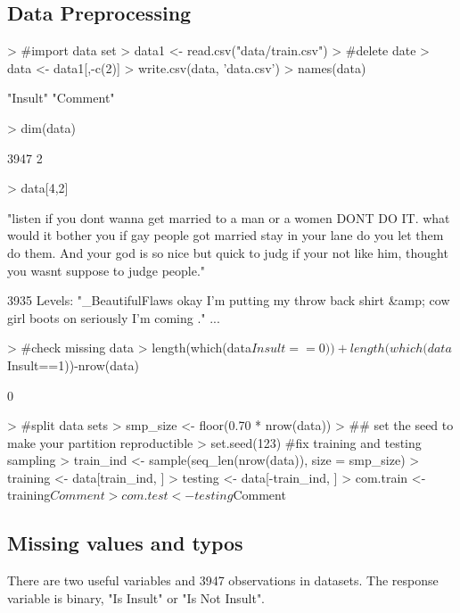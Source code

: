 \documentclass[11pt]{article}
\begin{document}
\begin{singlespacing}
\section{Data Preprocessing}
\begin{Schunk}
\begin{Sinput}
> #import data set
> data1 <- read.csv("data/train.csv")
> #delete date
> data <- data1[,-c(2)]
> write.csv(data, 'data.csv')
> names(data)
\end{Sinput}
\begin{Soutput}
[1] "Insult"  "Comment"
\end{Soutput}
\begin{Sinput}
> dim(data)
\end{Sinput}
\begin{Soutput}
[1] 3947    2
\end{Soutput}
\begin{Sinput}
> data[4,2]
\end{Sinput}
\begin{Soutput}
[1] "listen if you dont wanna get married to a man or a women DONT DO IT. what would it bother 
you if gay people got married stay in your lane do you let them do them. And your god is so nice 
but quick to judg if your not like him, thought you wasnt suppose to judge people."

3935 Levels: "_BeautifulFlaws okay I'm putting my throw back shirt &amp; cow girl boots on
seriously I'm coming ." ...
\end{Soutput}
\begin{Sinput}
> #check missing data
> length(which(data$Insult==0))+length(which(data$Insult==1))-nrow(data)
\end{Sinput}
\begin{Soutput}
[1] 0
\end{Soutput}
\begin{Sinput}
> #split data sets
> smp_size <- floor(0.70 * nrow(data))
> ## set the seed to make your partition reproductible
> set.seed(123) #fix training and testing sampling
> train_ind <- sample(seq_len(nrow(data)), size = smp_size)
> training <- data[train_ind, ]
> testing <- data[-train_ind, ]
> com.train <- training$Comment
> com.test <- testing$Comment
\end{Sinput}
\end{Schunk}
 
\subsection{Missing values and typos}
There are two useful variables and 3947 observations in datasets. The response variable is binary, "Is Insult" or "Is Not Insult". \\


\end{singlespacing}
\end{document}
